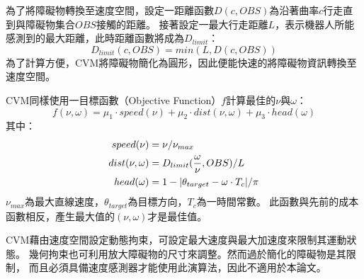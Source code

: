 為了將障礙物轉換至速度空間，設定一距離函數$D(c,OBS)$為沿著曲率$c$行走直到與障礙物集合$OBS$接觸的距離。
接著設定一最大行走距離$L$，表示機器人所能感測到的最大距離，此時距離函數將成為$D_{limit}$：
\begin{equation}
	D_{limit}(c,OBS) = min(L,D(c,OBS))
\end{equation}
為了計算方便，CVM將障礙物簡化為圓形，因此便能快速的將障礙物資訊轉換至速度空間。

CVM同樣使用一目標函數（Objective Function）$f$計算最佳的$\nu$與$\omega$：
\begin{equation}
	f(\nu,\omega) = \mu_1 \cdot speed(\nu) + \mu_2 \cdot dist(\nu,\omega) + \mu_3 \cdot head(\omega)
\end{equation}
其中：
\begin{align*}
	speed(\nu)	&= \nu / \nu_{max} \\ 
	dist(\nu,\omega)	&= D_{limit}({\omega \over \nu},OBS) / L \\
	head(\omega)	&= 1 - |\theta_{target} - \omega \cdot T_{c} | / \pi \\
\end{align*}
$\nu_{max}$為最大直線速度，$\theta_{target}$為目標方向，$T_c$為一時間常數。
此函數與先前的成本函數相反，產生最大值的$(\nu,\omega)$才是最佳值。

CVM藉由速度空間設定動態拘束，可設定最大速度與最大加速度來限制其運動狀態。
幾何拘束也可利用放大障礙物的尺寸來調整。然而過於簡化的障礙物是其限制，
而且必須具備速度感測器才能使用此演算法，因此不適用於本論文。

